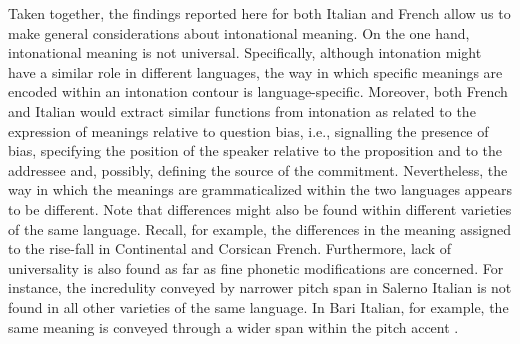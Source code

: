 \documentclass[output=paper,colorlinks,citecolor=brown]{langscibook}
\begin{document}
Taken together, the findings reported here for both Italian and French allow us to make general considerations about intonational meaning. On the one hand, intonational meaning is not universal. Specifically, although intonation might have a similar role in different languages, the way in which specific meanings are encoded within an intonation contour is language-specific. Moreover, both French and Italian would extract similar functions from intonation as related to the expression of meanings relative to question bias, i.e., signalling the presence of bias, specifying the position of the speaker relative to the proposition and to the addressee and, possibly, defining the source of the commitment. Nevertheless, the way in which the meanings are grammaticalized within the two languages appears to be different. Note that differences might also be found within different varieties of the same language. Recall, for example, the differences in the meaning assigned to the rise-fall in Continental and Corsican French. Furthermore, lack of universality is also found as far as fine phonetic modifications are concerned. For instance, the incredulity conveyed by narrower pitch span in Salerno Italian is not found in all other varieties of the same language. In Bari Italian, for example, the same meaning is conveyed through a wider span within the pitch accent \citep{savino2011aa}.
\end{document}
